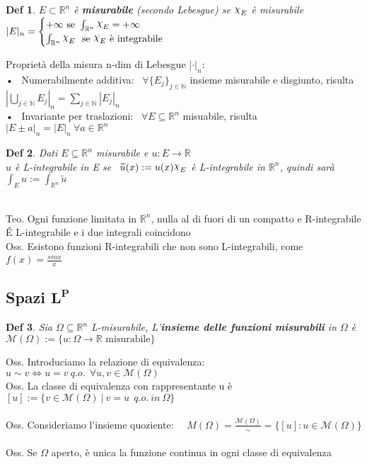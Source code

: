 \documentclass{article}
\theoremstyle{unnumbered}
\newtheorem* {theoremT}{Def}
\theoremstyle{unnumbered1}
\newenvironment{defi}{\begin{gBox}\begin{theoremT}}{\end{theoremT}\end{gBox}}
\DeclareRobustCommand{\Chi}{{\mathpalette\irchi\relax}}
\newcommand{\irchi}[2]{\raisebox{\depth}{$#1\chi$}} %
\begin{document}
\begin{defi}
$E\subset\mathbb{R}^n$ è \textbf{misurabile} (secondo Lebesgue) se $\Chi_E$ è misurabile \ \ \ $|E|_n=\begin{cases}+\infty \text{ se } \int_{\mathbb{R}^n}\Chi_E=+\infty \\ \int_{\mathbb{R}^n}\Chi_E \ \text{ se } \Chi_E \text{ è integrabile}\end{cases}$
\end{defi}
%
%
Proprietà della misura n-dim di Lebesgue $|\cdot|_n$:\\
• \  Numerabilmente additiva: \ $\forall \{E_j\}_{j\in\mathbb{N}}$ insieme misurabile e disgiunto, risulta $|\bigcup_{j\in\mathbb{N}}E_j|_n=\sum_{j\in\mathbb{N}}|E_j|_n$\\
• \ Invariante per traslazioni: \ $\forall E\subseteq\mathbb{R}^n$ misuabile, risulta \ $|E\pm a|_n=|E|_n \ \forall a\in\mathbb{R}^n$\\
%
\begin{defi}
Dati $E\subseteq\mathbb{R}^n$ misurabile e $u:E\to\mathbb{R}$\\
$u$ è L-integrabile in E se \ $\widetilde{u}(x):=u(x)\Chi_E$ è L-integrabile in $\mathbb{R}^n$, quindi sarà $\int_E u:=\int_{\mathbb{R}^n}\widetilde{u}$ 
\end{defi}
%
%
\phantom{}\\
%
Teo. Ogni funzione limitata in $\mathbb{R}^n$, nulla al di fuori di un compatto e R-integrabile\\
É L-integrabile e i due integrali coincidono\\
%
Oss. Esistono funzioni R-integrabili che non sono L-integrabili, come $f(x)=\frac{sinx}{x}$\\



\subsection{Spazi $\mathbf{L^P}$}


\begin{defi}
Sia $\Omega\subseteq\mathbb{R}^n$ L-misurabile, L'\textbf{insieme delle funzioni misurabili} in $\Omega$ è\\ $\mathcal{M}(\Omega):=\{u:\Omega\to\mathbb{R} \text{ misurabile}\}$
\end{defi}
%
%
Oss. Introduciamo la relazione di equivalenza: \ \ $u\sim v \Leftrightarrow u=v \ q.o. \ \ \forall u,v\in\mathcal{M}(\Omega)$\\
Oss. La classe di equivalenza con rappresentante u è \ \ $[u]:=\{v\in\mathcal{M}(\Omega)\ | \ v=u \ \ q.o. \ in \ \Omega\}$\\ \\
%
Oss. Consideriamo l'insieme quoziente: \ \ $M(\Omega)=\frac{\mathcal{M}(\Omega)}{\sim}=\{[u] : u\in\mathcal{M}(\Omega)\}$\\ \\
%
Oss. Se $\Omega$ aperto, è unica la funzione continua in ogni classe di equivalenza\\ 
\end{document}
